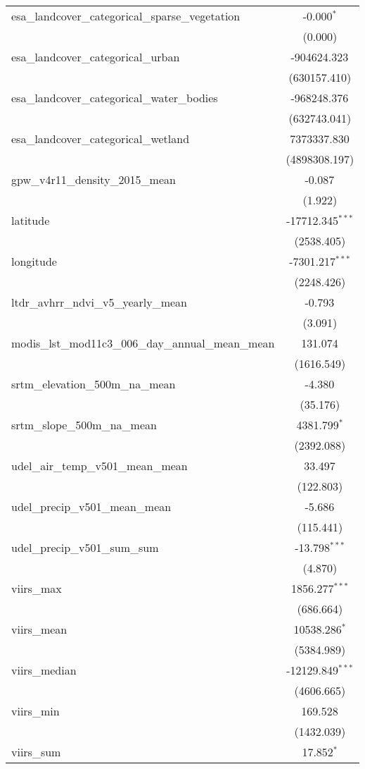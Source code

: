 \begin{table}[!htbp]
\begin{tabular}{@{\extracolsep{5pt}}lc}
 esa_landcover_categorical_sparse_vegetation & -0.000$^{*}$ \\
  & (0.000) \\
 esa_landcover_categorical_urban & -904624.323$^{}$ \\
  & (630157.410) \\
 esa_landcover_categorical_water_bodies & -968248.376$^{}$ \\
  & (632743.041) \\
 esa_landcover_categorical_wetland & 7373337.830$^{}$ \\
  & (4898308.197) \\
 gpw_v4r11_density_2015_mean & -0.087$^{}$ \\
  & (1.922) \\
 latitude & -17712.345$^{***}$ \\
  & (2538.405) \\
 longitude & -7301.217$^{***}$ \\
  & (2248.426) \\
 ltdr_avhrr_ndvi_v5_yearly_mean & -0.793$^{}$ \\
  & (3.091) \\
 modis_lst_mod11c3_006_day_annual_mean_mean & 131.074$^{}$ \\
  & (1616.549) \\
 srtm_elevation_500m_na_mean & -4.380$^{}$ \\
  & (35.176) \\
 srtm_slope_500m_na_mean & 4381.799$^{*}$ \\
  & (2392.088) \\
 udel_air_temp_v501_mean_mean & 33.497$^{}$ \\
  & (122.803) \\
 udel_precip_v501_mean_mean & -5.686$^{}$ \\
  & (115.441) \\
 udel_precip_v501_sum_sum & -13.798$^{***}$ \\
  & (4.870) \\
 viirs_max & 1856.277$^{***}$ \\
  & (686.664) \\
 viirs_mean & 10538.286$^{*}$ \\
  & (5384.989) \\
 viirs_median & -12129.849$^{***}$ \\
  & (4606.665) \\
 viirs_min & 169.528$^{}$ \\
  & (1432.039) \\
 viirs_sum & 17.852$^{*}$ \\

\end{tabular}
\end{table}
